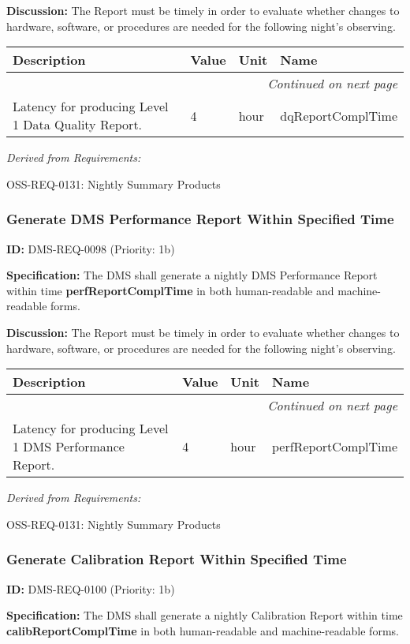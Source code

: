\documentclass[SE,toc,lsstdraft]{lsstdoc}
\makeatletter
\newcommand{\paramname}[1]{\hspace{0pt}#1}
\newcommand{\unitname}[1]{\hspace{0pt}#1}
\newenvironment{parameters}[0]{%
\setlength\LTleft{0pt}
\setlength\LTright{\fill}
\begin{small}
\begin{longtable}[]{|p{0.49\textwidth}|l|p{0.6in}|p{1.70in}@{}|}

\hline \textbf{Description} & \textbf{Value} & \textbf{Unit} & \textbf{Name} \\ \hline
\endhead

\hline \multicolumn{4}{r}{\emph{Continued on next page}} \\
\endfoot

\hline\hline
\endlastfoot
}{%
\hline
\end{longtable}
\end{small}
}
\makeatother
\begin{document}
\textbf{Discussion:} The Report must be timely in order to evaluate whether changes to hardware, software, or procedures are needed for the following night's observing.

\begin{parameters}
Latency for producing Level 1 Data Quality Report.
&
4
&
\unitname{%
hour
}
&
\paramname{%
dqReportComplTime
} \\\hline
\end{parameters}

\emph{Derived from Requirements:}

OSS-REQ-0131:
Nightly Summary Products \newline

\subsubsection{Generate DMS Performance Report Within Specified Time}

\label{DMS-REQ-0098}
\textbf{ID:} DMS-REQ-0098 (Priority: 1b)

\textbf{Specification:} The DMS shall generate a nightly DMS Performance Report within time \textbf{perfReportComplTime }in both human-readable and machine-readable forms.

\textbf{Discussion:} The Report must be timely in order to evaluate whether changes to hardware, software, or procedures are needed for the following night's observing.

\begin{parameters}
Latency for producing Level 1 DMS Performance Report.
&
4
&
\unitname{%
hour
}
&
\paramname{%
perfReportComplTime
} \\\hline
\end{parameters}

\emph{Derived from Requirements:}

OSS-REQ-0131:
Nightly Summary Products \newline

\subsubsection{Generate Calibration Report Within Specified Time}

\label{DMS-REQ-0100}
\textbf{ID:} DMS-REQ-0100 (Priority: 1b)

\textbf{Specification:} The DMS shall generate a nightly Calibration Report within time \textbf{calibReportComplTime }in both human-readable and machine-readable forms.
\end{document}
